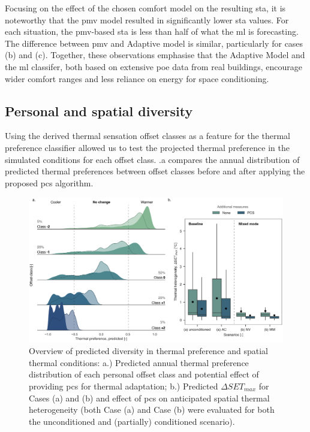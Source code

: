 Focusing on the effect of the chosen comfort model on the resulting \gls{sta}, it is noteworthy that the \gls{pmv} model resulted in significantly lower \gls{sta} values. For each situation, the \gls{pmv}-based \gls{sta} is less than half of what the \gls{ml} is forecasting. The difference between \gls{pmv} and Adaptive model is similar, particularly for cases (b) and (c). Together, these observations emphasise that the Adaptive Model and the \gls{ml} classifer, both based on extensive \gls{poe} data from real buildings, encourage wider comfort ranges and less reliance on energy for space conditioning.



\subsection{Personal and spatial diversity}

Using the derived thermal sensation offset classes as a feature for the thermal preference classifier allowed us to test the projected thermal preference in the simulated conditions for each offset class. .a compares the annual distribution of predicted thermal preferences between offset classes before and after applying the proposed \gls{pcs} algorithm.


\begin{figure}[!h]
    \begin{center}
    \includegraphics[width=\textwidth]{manuscript/src/figures/personal-spatial-diversity.png}
    \caption{Overview of predicted diversity in thermal preference and spatial thermal conditions: a.) Predicted annual thermal preference distribution of each personal offset class and potential effect of providing \gls{pcs} for thermal adaptation; b.) Predicted $\Delta SET_{max}$ for Cases (a) and (b) and effect of \gls{pcs} on anticipated spatial thermal heterogeneity (both Case (a) and Case (b) were evaluated for both the unconditioned and (partially) conditioned scenario). }
    \label{fig:diversity}
    \end{center}
\end{figure}


